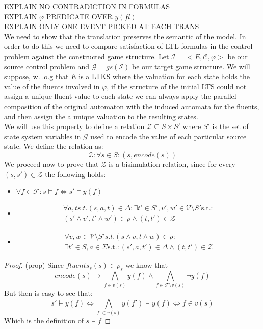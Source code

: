 EXPLAIN NO CONTRADICTION IN FORMULAS\\
EXPLAIN $\varphi$ PREDICATE OVER $y(fl)$\\
EXPLAIN ONLY ONE EVENT PICKED AT EACH TRANS\\
We need to show that the translation preserves the semantic of
the model.  In order to do this we need to compare satisfaction of
LTL formulas in the control problem against the constructed
game structure.  Let $\mathcal{I} = <E, \mathcal{C}, \varphi>$
be our source control problem and $\mathcal{G} = gs(\mathcal{I})$ be our target
game structure. We will suppose, w.l.o.g that $E$ is a LTKS where the
valuation for each state holds the value of the fluents involved in
$\varphi$, if the structure of the initial LTS could not assign
a unique fluent value to each state we can always apply the parallel
composition of the original automaton with the induced automata for
the fluents, and then assign the a unique valuation to the resulting
states.\\
We will use this property to define a relation 
$\mathcal{Z} \subseteq S \times S'$ where $S'$ is the set of state
system variables in $\mathcal{G}$ used to encode the value of each
particular source state.  We define the relation as:
\[ \mathcal{Z} : {\forall s \in S : (s, encode(s))} \]
We proceed now to prove that $\mathcal{Z}$ is a bisimulation relation,
since for every $(s, s') \in \mathcal{Z}$ the following holds:
\begin{itemize}
	\item [(prop)] $\forall f \in \mathcal{F}: s \models f \iff s' \models y(f)$ 
	\item[(forth)] \[
		\begin{array}{l}
			\forall a,t s.t. (s,a,t) \in \Delta: \exists t' \in S', v',w' \in \mathcal{V}\setminus S' \text{s.t.}:\\
			(s' \wedge v',t' \wedge w') \in \rho
			\wedge (t, t') \in \mathcal{Z} 
		\end{array}	
		\]
	\item[(back)] \[
		\begin{array}{l}
			\forall v,w \in \mathcal{V} \setminus S' s.t. (s \wedge v,t \wedge w) \in \rho:\\
			\exists t' \in S, a \in \Sigma \text{s.t.}:
			(s',a,t') \in \Delta
			\wedge (t, t') \in \mathcal{Z} 
		\end{array}	
		\]		
\end{itemize}
\begin{proof}{(prop)}
Since $fluents_s(s) \in \rho_s$ we know that \[encode(s) \rightarrow \bigwedge_{f \in v(s)} y(f) \wedge \bigwedge_{f \in \mathcal{F} \setminus v(s)}\neg y(f) \]
But then is easy to see that:
\[s' \models y(f) \iff \bigwedge_{f' \in v(s)} y(f') \models y(f) \iff f \in v(s)  \]
Which is the definition of $s \models f$
\end{proof}
